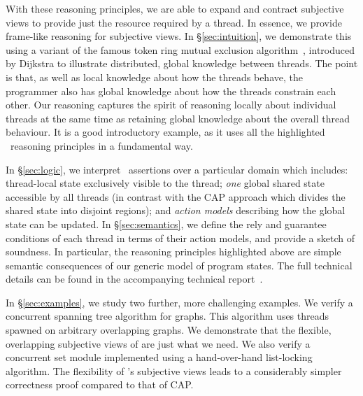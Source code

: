 With these reasoning principles, we are able to expand and contract
subjective views  to provide just the resource required by a thread.
In essence, we provide  frame-like reasoning for  subjective  views. 
In 
\S\ref{sec:intuition}, we 
demonstrate this using 
a variant of the famous  token ring mutual exclusion algorithm~\cite{dijkstra74},
introduced by Dijkstra to illustrate distributed, global knowledge between
threads. The point is that, as well as local knowledge
about how the threads behave, the programmer also has global knowledge
about how the threads constrain each other. Our reasoning captures the
spirit of reasoning locally about individual threads at the same time
as retaining global knowledge about the overall thread behaviour. It
is a good  introductory example, as it uses all the highlighted \colosl\ reasoning principles in a fundamental way. 

In \S\ref{sec:logic}, we interpret \colosl\ assertions
 over a particular domain which includes: thread-local
state exclusively visible to the thread; {\em one} global shared state
accessible by all threads (in contrast with the CAP approach which divides the shared state into disjoint regions); and {\em
  action models} describing how the global state can be updated.  In
\S\ref{sec:semantics}, we define the rely and guarantee conditions
of each thread in terms of their action models, and provide a
sketch of soundness. In particular, the
reasoning principles highlighted above are simple semantic
consequences of our generic model of program states.  The full
technical details can
be found 
in the accompanying technical report~\cite{colosl-tr14}.



In \S\ref{sec:examples}, we study two further, more challenging
examples. We verify a concurrent spanning tree algorithm for
graphs. This algorithm uses threads spawned on arbitrary overlapping
graphs. We demonstrate that the flexible, overlapping subjective views
of \colosl are just what we need.  We also verify a concurrent set
module implemented using a hand-over-hand list-locking algorithm.
The flexibility of \colosl's subjective views  leads to a
considerably simpler correctness proof compared to that of CAP. 


